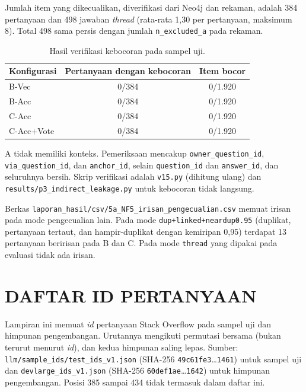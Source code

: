 Jumlah item yang dikecualikan, diverifikasi dari Neo4j dan rekaman, adalah 384 pertanyaan dan 498 jawaban \emph{thread} (rata-rata 1,30 per pertanyaan, maksimum 8). Total 498 sama persis dengan jumlah \texttt{n\_\allowbreak{}excluded\_\allowbreak{}a} pada rekaman.

\begin{table}[!htbp]
\centering
\small
\caption{Hasil verifikasi kebocoran pada sampel uji.}
\label{tab:lamp-bocor}
\renewcommand{\arraystretch}{1.2}
\begin{tabular}{|l|c|c|}
\hline
\textbf{Konfigurasi} & \textbf{Pertanyaan dengan kebocoran} & \textbf{Item bocor} \\
\hline
B-Vec & 0/384 & 0/1.920 \\
B-Acc & 0/384 & 0/1.920 \\
C-Acc & 0/384 & 0/1.920 \\
C-Acc+Vote & 0/384 & 0/1.920 \\
\hline
\end{tabular}
\end{table}

A tidak memiliki konteks. Pemeriksaan mencakup \texttt{owner\_\allowbreak{}question\_\allowbreak{}id}, \texttt{via\_\allowbreak{}question\_\allowbreak{}id}, dan \texttt{anchor\_id}, selain \texttt{question\_id} dan \texttt{answer\_id}, dan seluruhnya bersih. Skrip verifikasi adalah \texttt{v15.py} (dihitung ulang) dan \texttt{results/\allowbreak{}p3\_\allowbreak{}indirect\_\allowbreak{}leakage.\allowbreak{}py} untuk kebocoran tidak langsung.

Berkas \texttt{laporan\_\allowbreak{}hasil/\allowbreak{}csv/\allowbreak{}5a\_\allowbreak{}NF5\_\allowbreak{}irisan\_\allowbreak{}pengecualian.\allowbreak{}csv} memuat irisan pada mode pengecualian lain. Pada mode \texttt{dup+linked+neardup0.\allowbreak{}95} (duplikat, pertanyaan tertaut, dan hampir-duplikat dengan kemiripan 0,95) terdapat 13 pertanyaan beririsan pada B dan C. Pada mode \texttt{thread} yang dipakai pada evaluasi tidak ada irisan.


\cleardoublepage
\chapter{DAFTAR ID PERTANYAAN}
\label{lamp:id}

Lampiran ini memuat \emph{id} pertanyaan Stack Overflow pada sampel uji dan himpunan pengembangan. Urutannya mengikuti permutasi bersama (bukan terurut menurut \emph{id}), dan kedua himpunan saling lepas. Sumber: \texttt{llm/\allowbreak{}sample\_\allowbreak{}ids/\allowbreak{}test\_\allowbreak{}ids\_\allowbreak{}v1.\allowbreak{}json} (SHA-256 \texttt{49c61fe3}\ldots\texttt{1461}) untuk sampel uji dan \texttt{devlarge\_\allowbreak{}ids\_\allowbreak{}v1.\allowbreak{}json} (SHA-256 \texttt{60def1ae}\ldots\texttt{1642}) untuk himpunan pengembangan. Posisi 385 sampai 434 tidak termasuk dalam daftar ini.

